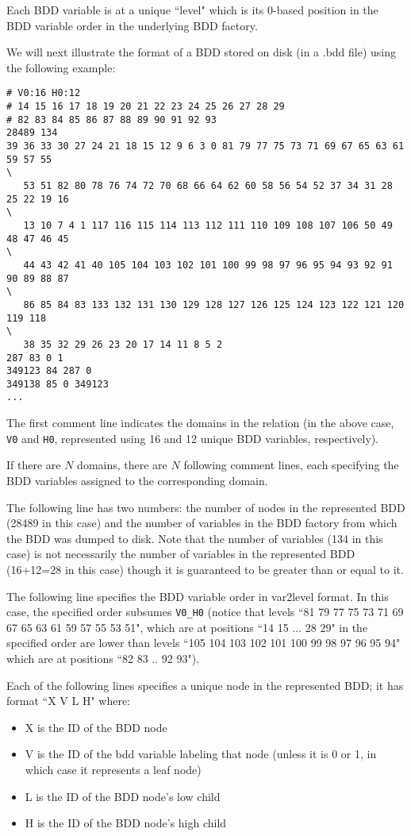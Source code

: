 Each BDD variable is at a unique ``level" which is its 0-based position in the
BDD variable order in the underlying BDD factory.

We will next illustrate the format of a BDD stored on disk (in a .bdd file)
using the following example:

\begin{framed}
\begin{verbatim}
# V0:16 H0:12
# 14 15 16 17 18 19 20 21 22 23 24 25 26 27 28 29
# 82 83 84 85 86 87 88 89 90 91 92 93
28489 134
39 36 33 30 27 24 21 18 15 12 9 6 3 0 81 79 77 75 73 71 69 67 65 63 61 59 57 55
\
   53 51 82 80 78 76 74 72 70 68 66 64 62 60 58 56 54 52 37 34 31 28 25 22 19 16
\
   13 10 7 4 1 117 116 115 114 113 112 111 110 109 108 107 106 50 49 48 47 46 45
\
   44 43 42 41 40 105 104 103 102 101 100 99 98 97 96 95 94 93 92 91 90 89 88 87
\
   86 85 84 83 133 132 131 130 129 128 127 126 125 124 123 122 121 120 119 118
\
   38 35 32 29 26 23 20 17 14 11 8 5 2
287 83 0 1
349123 84 287 0
349138 85 0 349123
...
\end{verbatim}
\end{framed}


The first comment line indicates the domains in the relation (in the above case,
{\tt V0} and {\tt H0},
represented using 16 and 12 unique BDD variables, respectively).

If there are $N$ domains, there are $N$ following comment lines, each specifying
the
BDD variables assigned to the corresponding domain.

The following line has two numbers: the number of nodes in the represented BDD
(28489 in this case) and the number of variables
in the BDD factory from which the BDD was dumped to disk.  Note that the number
of variables (134 in this case) is not
necessarily the number of variables in the represented BDD (16+12=28 in this
case) though it is guaranteed to be
greater than or equal to it.

The following line specifies the BDD variable order in var2level format.  In
this case, the specified order subsumes
{\tt V0\_H0} (notice that levels ``81 79 77 75 73 71 69 67 65 63 61 59 57 55 53
51", which are at positions ``14 15 ... 28 29"
in the specified order are lower than levels ``105 104 103 102 101 100 99 98 97
96 95 94" which are at positions
``82 83 .. 92 93").

Each of the following lines specifies a unique node in the represented BDD; it
has format ``X V L H" where:
\begin{itemize}
\item X is the ID of the BDD node
\item V is the ID of the bdd variable labeling that node (unless it is 0 or 1,
in which case it represents a leaf node)
\item L is the ID of the BDD node's low child
\item H is the ID of the BDD node's high child
\end{itemize}

